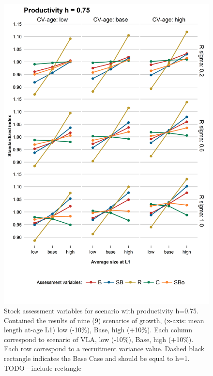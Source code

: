 \begin{figure}[hbtp]
	\begin{center}
\includegraphics[width=0.70\columnwidth]{figures/steepness-75-estado.png}
  \end{center}
\caption{Stock assessment variables for scenario with productivity h=0.75. Contained the results of nine (9) scenarios of growth, (x-axis: mean length at-age L1) low (-10\%), Base, high (+10\%). Each column correspond to scenario of VLA, low (-10\%), Base, high (+10\%). Each row correspond to a recruitment variance value. Dashed black rectangle indicates the Base Case and should be equal to h=1. TODO---include rectangle}
\label{figure1}
\end{figure}


